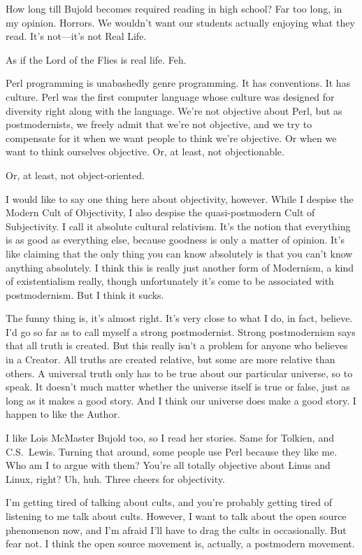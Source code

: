 \documentclass[10pt,letterpaper]{article}
\begin{document}
How long till Bujold becomes required reading in high school? Far too long,
in my opinion. Horrors. We wouldn't want our students actually enjoying what
they read. It's not---it's not Real Life.

As if the Lord of the Flies is real life. Feh.

Perl programming is unabashedly genre programming. It has conventions. It has
culture. Perl was the first computer language whose culture was designed for
diversity right along with the language. We're not objective about Perl, but
as postmodernists, we freely admit that we're not objective, and we try to
compensate for it when we want people to think we're objective. Or when we
want to think ourselves objective. Or, at least, not objectionable.

Or, at least, not object-oriented.

I would like to say one thing here about objectivity, however. While I
despise the Modern Cult of Objectivity, I also despise the quasi-postmodern
Cult of Subjectivity. I call it absolute cultural relativism. It's the notion
that everything is as good as everything else, because goodness is only a
matter of opinion. It's like claiming that the only thing you can know
absolutely is that you can't know anything absolutely. I think this is really
just another form of Modernism, a kind of existentialism really, though
unfortunately it's come to be associated with postmodernism. But I think it
sucks.

The funny thing is, it's almost right. It's very close to what I do, in fact,
believe. I'd go so far as to call myself a strong postmodernist. Strong
postmodernism says that all truth is created. But this really isn't a problem
for anyone who believes in a Creator. All truths are created relative, but
some are more relative than others. A universal truth only has to be true
about our particular universe, so to speak. It doesn't much matter whether
the universe itself is true or false, just as long as it makes a good story.
And I think our universe does make a good story. I happen to like the Author.

I like Lois McMaster Bujold too, so I read her stories. Same for Tolkien, and
C.S.~Lewis. Turning that around, some people use Perl because they like me.
Who am I to argue with them? You're all totally objective about Linus and
Linux, right? Uh, huh. Three cheers for objectivity.

I'm getting tired of talking about cults, and you're probably getting tired
of listening to me talk about cults. However, I want to talk about the open
source phenomenon now, and I'm afraid I'll have to drag the cults in
occasionally. But fear not. I think the open source movement is, actually, a
postmodern movement.
\end{document}
